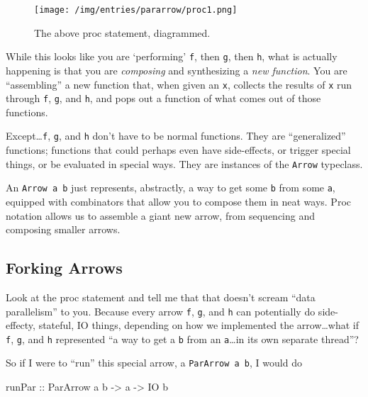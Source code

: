 \documentclass[]{article}
\newenvironment{Shaded}{\begin{snugshade}}{\end{snugshade}}
\newcommand{\DataTypeTok}[1]{\textcolor[rgb]{0.13,0.29,0.53}{#1}}
\newcommand{\NormalTok}[1]{#1}
\newcommand{\OtherTok}[1]{\textcolor[rgb]{0.56,0.35,0.01}{#1}}
\begin{document}
\begin{figure}
\centering
\texttt{[image: /img/entries/pararrow/proc1.png]}
\caption{The above proc statement, diagrammed.}
\end{figure}

While this looks like you are `performing' \texttt{f}, then \texttt{g}, then
\texttt{h}, what is actually happening is that you are \emph{composing} and
synthesizing a \emph{new function}. You are ``assembling'' a new function that,
when given an \texttt{x}, collects the results of \texttt{x} run through
\texttt{f}, \texttt{g}, and \texttt{h}, and pops out a function of what comes
out of those functions.

Except\ldots{}\texttt{f}, \texttt{g}, and \texttt{h} don't have to be normal
functions. They are ``generalized'' functions; functions that could perhaps even
have side-effects, or trigger special things, or be evaluated in special ways.
They are instances of the \texttt{Arrow} typeclass.

An \texttt{Arrow\ a\ b} just represents, abstractly, a way to get some
\texttt{b} from some \texttt{a}, equipped with combinators that allow you to
compose them in neat ways. Proc notation allows us to assemble a giant new
arrow, from sequencing and composing smaller arrows.

\hypertarget{forking-arrows}{%
\subsection{Forking Arrows}\label{forking-arrows}}

Look at the proc statement and tell me that that doesn't scream ``data
parallelism'' to you. Because every arrow \texttt{f}, \texttt{g}, and \texttt{h}
can potentially do side-effecty, stateful, IO things, depending on how we
implemented the arrow\ldots{}what if \texttt{f}, \texttt{g}, and \texttt{h}
represented ``a way to get a \texttt{b} from an \texttt{a}\ldots{}in its own
separate thread''?

So if I were to ``run'' this special arrow, a \texttt{ParArrow\ a\ b}, I would
do

\begin{Shaded}
\begin{Highlighting}[]
\OtherTok{runPar ::} \DataTypeTok{ParArrow}\NormalTok{ a b }\OtherTok{->}\NormalTok{ a }\OtherTok{->} \DataTypeTok{IO}\NormalTok{ b}
\end{Highlighting}
\end{Shaded}
\end{document}
